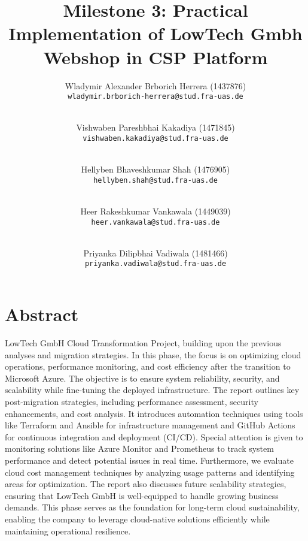 \documentclass{llncs}
\newcommand{\what}{Milestone 3: Practical Implementation of LowTech Gmbh Webshop in CSP Platform}
\begin{document}
%
%
%
\mainmatter              %
%
\title{\what}
%
\author{
    Wladymir Alexander Brborich Herrera (1437876)\\
    \texttt{wladymir.brborich-herrera@stud.fra-uas.de}
    \and\\
    Vishwaben Pareshbhai Kakadiya (1471845)\\
    \texttt{vishwaben.kakadiya@stud.fra-uas.de}
    \and\\
    Hellyben Bhaveshkumar Shah (1476905)\\
    \texttt{hellyben.shah@stud.fra-uas.de}
    \and\\
    Heer Rakeshkumar Vankawala (1449039)
    \\
    \texttt{heer.vankawala@stud.fra-uas.de}
    \and\\
    Priyanka Dilipbhai Vadiwala (1481466)\\
    \texttt{priyanka.vadiwala@stud.fra-uas.de}
}
%

\maketitle              %


\section*{Abstract}

LowTech GmbH Cloud Transformation Project, building upon the previous analyses and migration strategies. In this phase,  
the focus is on optimizing cloud operations, performance monitoring, and cost efficiency after the transition to Microsoft  
Azure. The objective is to ensure system reliability, security, and scalability while fine-tuning the deployed infrastructure.  
The report outlines key post-migration strategies, including performance assessment, security enhancements, and cost analysis.  
It introduces automation techniques using tools like Terraform and Ansible for infrastructure management and GitHub Actions for  
continuous integration and deployment (CI/CD). Special attention is given to monitoring solutions like Azure Monitor and Prometheus  
to track system performance and detect potential issues in real time.  Furthermore, we evaluate cloud cost management techniques by analyzing usage patterns and identifying areas for optimization.  
The report also discusses future scalability strategies, ensuring that LowTech GmbH is well-equipped to handle growing business demands.  
This phase serves as the foundation for long-term cloud sustainability, enabling the company to leverage cloud-native solutions efficiently  
while maintaining operational resilience.  
\end{document}

